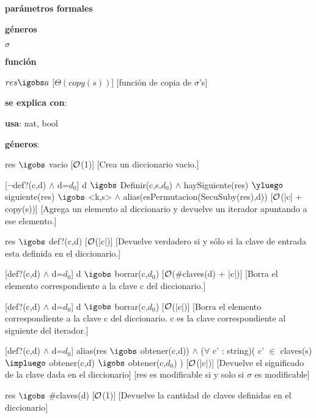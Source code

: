 \begin{Interfaz}

	\textbf{parámetros formales}\parindent\\
	\parbox{1.7cm}{\textbf{géneros}} $\sigma$\\
	\parbox[t]{1.7cm}{\textbf{función}}\parbox[t]{\textwidth-2\parindent-1.7cm}{%
	    	{$res \igobs a$}
		[$\Theta(copy(s))$]
		[función de copia de $\sigma$'s]
	}
	
	\textbf{se explica con}: 
	
	\textbf{usa}: nat, bool
	
	\textbf{géneros}: 
	
	
	{res $\igobs$ vacio}
	[$\mathcal{O}$(1)]
	[Crea un diccionario vacio.]
	
	[$\neg$def?(c,d) $\land$ d=$d_0$]
	{d $\igobs$ Definir(c,s,$d_0$) $\land$ haySiguiente(res) $\yluego$ siguiente(res) $\igobs$ <k,s> $\land$ alias(esPermutacion(SecuSuby(res),d))}
	[$\mathcal{O}$(|c| + copy(s))]
	[Agrega un elemento al diccionario y devuelve un iterador apuntando a ese elemento.]	
	
	{res $\igobs$ def?(c,d)}
	[$\mathcal{O}$(|c|)]
	[Devuelve verdadero si y sólo si la clave de entrada esta definida en el diccionario.]	
	
	[def?(c,d) $\land$ d=$d_0$]
	{d $\igobs$ borrar(c,$d_0$)}
	[$\mathcal{O}$($\#$claves(d) $+$ |c|)]
	[Borra el elemento correspondiente a la clave c del diccionario.]
	
	[def?(c,d) $\land$ d=$d_0$]
	{d $\igobs$ borrar(c,$d_0$)}
	[$\mathcal{O}$(|c|)]
	[Borra el elemento correspondiente a la clave c del diccionario. c es la clave correspondiente al siguiente del iterador.]
	
	[def?(c,d) $\land$ d=$d_0$]
	{alias(res $\igobs$ obtener(c,d)) $\land$ ($\forall$ c' : string)( c' $\in$ claves(s) $\impluego$ obtener(c,d) $\igobs$ obtener(c,$d_0$) )}
	[$\mathcal{O}$(|c|)]
	[Devuelve el significado de la clave dada en el diccionario]
	[res es modificable si y solo si $\sigma$ es modificable]
	
	{res $\igobs$ $\#$claves(d)}
	[$\mathcal{O}$(1)]
	[Devuelve la cantidad de claves definidas en el diccionario]
	
\end{Interfaz}

